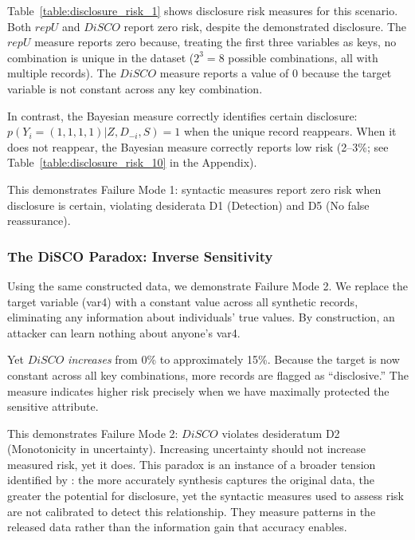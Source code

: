 \documentclass[Afour,sageh,times,doublespace]{sagej}
\begin{document}
Table~\ref{table:disclosure_risk_1} shows disclosure risk measures for this scenario. Both $repU$ and $DiSCO$ report zero risk, despite the demonstrated disclosure. The $repU$ measure reports zero because, treating the first three variables as keys, no combination is unique in the dataset ($2^3 = 8$ possible combinations, all with multiple records). The $DiSCO$ measure reports a value of 0 because the target variable is not constant across any key combination.

\begin{table}[h]
    \centering
    \caption{Disclosure risk measures for simulated data}
    \resizebox{\columnwidth}{!}{}
    \label{table:disclosure_risk_1}
\end{table}

In contrast, the Bayesian measure correctly identifies certain disclosure: $p(Y_i = (1,1,1,1) | Z, D_{-i}, S) = 1$ when the unique record reappears. When it does not reappear, the Bayesian measure correctly reports low risk (2--3\%; see Table~\ref{table:disclosure_risk_10} in the Appendix).

This demonstrates Failure Mode 1: syntactic measures report zero risk when disclosure is certain, violating desiderata D1 (Detection) and D5 (No false reassurance).

\subsubsection{The DiSCO Paradox: Inverse Sensitivity}

Using the same constructed data, we demonstrate Failure Mode 2. We replace the target variable (var4) with a constant value across all synthetic records, eliminating any information about individuals' true values. By construction, an attacker can learn nothing about anyone's var4.

Yet $DiSCO$ \textit{increases} from 0\% to approximately 15\%. Because the target is now constant across all key combinations, more records are flagged as ``disclosive.'' The measure indicates higher risk precisely when we have maximally protected the sensitive attribute.

This demonstrates Failure Mode 2: $DiSCO$ violates desideratum D2 (Monotonicity in uncertainty). Increasing uncertainty should not increase measured risk, yet it does. This paradox is an instance of a broader tension identified by \citet{Hotz2022}: the more accurately synthesis captures the original data, the greater the potential for disclosure, yet the syntactic measures used to assess risk are not calibrated to detect this relationship. They measure patterns in the released data rather than the information gain that accuracy enables.
\end{document}
